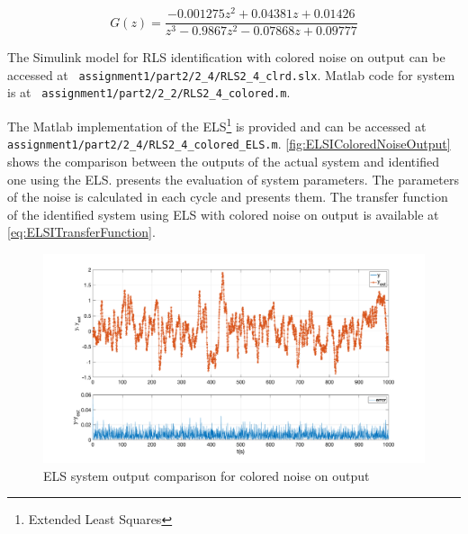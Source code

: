 \begin{equation}
	G(z) =	\frac{ -0.001275 z^2 + 0.04381 z + 0.01426}{z^3 - 0.9867 z^2 - 0.07868 z + 0.09777}
	\label{eq:RLSICNOTransferFunction}
\end{equation}

The Simulink model for RLS identification with colored noise on output can be accessed at \hspace{-1ex}\lstinline| assignment1/part2/2_4/RLS2_4_clrd.slx|.
Matlab code for system is at \hspace{-1ex}\lstinline| assignment1/part2/2_2/RLS2_4_colored.m|.

The Matlab implementation of the ELS\footnote{Extended Least Squares } is provided and can be accessed at \hspace{-1ex}\lstinline| assignment1/part2/2_4/RLS2_4_colored_ELS.m|.
\autoref{fig:ELSIColoredNoiseOutput} shows the comparison between the outputs of the actual system and identified one using the ELS.  presents the evaluation of system parameters.
The parameters of the noise is calculated in each cycle and  presents them. The transfer function of the identified system using ELS with colored noise on output is available at \autoref{eq:ELSITransferFunction}.

\begin{figure}
	\centering
	\includegraphics[totalheight=8cm]{images/ELSIColoredNoiseOutput.png}
	\caption{ELS system output comparison for colored noise on output}
	\label{fig:ELSIColoredNoiseOutput}
\end{figure}


